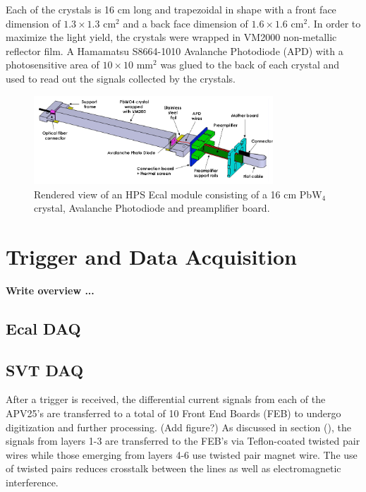Each of the crystals is 16 cm long and trapezoidal in shape with a front face
dimension of $1.3 \times 1.3$ cm$^2$ and a back face dimension of $1.6 \times
1.6$ cm$^2$.  In order to maximize the light yield, the crystals were wrapped
in VM2000 non-metallic reflector film. A Hamamatsu S8664-1010 Avalanche 
Photodiode (APD) with a photosensitive area of $10 \times 10$ mm$^2$ was glued
to the back of each crystal and used to read out the signals collected by the
crystals.  
\begin{figure}
    \centering
    \includegraphics[width=0.8\textwidth]{images/ecal_crystal.png}
    \caption{Rendered view of an HPS Ecal module consisting of a 16 cm PbW$_4$
             crystal, Avalanche Photodiode and preamplifier board.}
    \label{fig:ecal_crystal}
\end{figure}

\section{Trigger and Data Acquisition}

\textbf{Write overview ...}

\subsection{Ecal DAQ}

\subsection{SVT DAQ}
%
%

After a trigger is received, the differential current signals 
from each of the APV25's are transferred to a total of 10 Front End Boards (FEB)
to undergo digitization and further processing. (Add figure?) As discussed in 
section (), the signals from layers 1-3 are transferred to the FEB's via 
Teflon-coated twisted pair wires while those emerging from
layers 4-6 use twisted pair magnet wire.  The use of twisted pairs reduces
crosstalk between the lines as well as electromagnetic interference.

